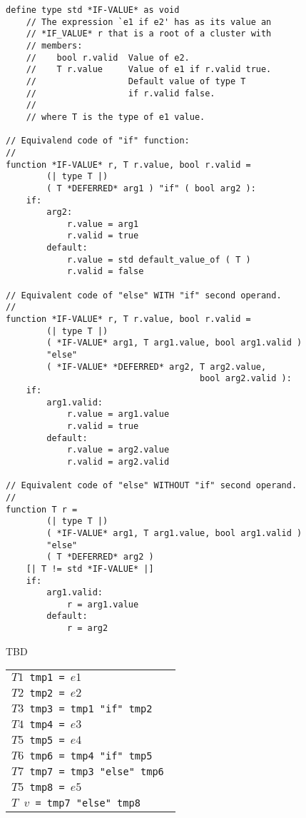 \documentclass[12pt]{article}
\newenvironment{indpar}[1][0.3in]%
	{\begin{list}{}%
		     {\setlength{\itemsep}{0in}%
		      \setlength{\topsep}{0in}%
		      \setlength{\parsep}{1ex}%
		      \setlength{\labelwidth}{#1}%
		      \setlength{\leftmargin}{#1}%
		      \addtolength{\leftmargin}{\labelsep}}%
	 \item}%
	{\end{list}}
\begin{document}
\begin{indpar}\begin{verbatim}
define type std *IF-VALUE* as void
    // The expression `e1 if e2' has as its value an
    // *IF_VALUE* r that is a root of a cluster with
    // members:
    //    bool r.valid  Value of e2.
    //    T r.value     Value of e1 if r.valid true.
    //                  Default value of type T
    //                  if r.valid false.
    //
    // where T is the type of e1 value.

// Equivalend code of "if" function:
//
function *IF-VALUE* r, T r.value, bool r.valid =
        (| type T |)
        ( T *DEFERRED* arg1 ) "if" ( bool arg2 ):
    if:
        arg2:
            r.value = arg1
            r.valid = true
        default:
            r.value = std default_value_of ( T )
            r.valid = false

// Equivalent code of "else" WITH "if" second operand.
//
function *IF-VALUE* r, T r.value, bool r.valid =
        (| type T |)
        ( *IF-VALUE* arg1, T arg1.value, bool arg1.valid )
        "else"
        ( *IF-VALUE* *DEFERRED* arg2, T arg2.value,
                                      bool arg2.valid ):
    if:
        arg1.valid:
            r.value = arg1.value
            r.valid = true
        default:
            r.value = arg2.value
            r.valid = arg2.valid

// Equivalent code of "else" WITHOUT "if" second operand.
//
function T r =
        (| type T |)
        ( *IF-VALUE* arg1, T arg1.value, bool arg1.valid )
        "else"
        ( T *DEFERRED* arg2 )
	[| T != std *IF-VALUE* |]
    if:
        arg1.valid:
            r = arg1.value
        default:
            r = arg2
\end{verbatim}\end{indpar}

TBD

\begin{center}
\begin{tabular}{l}
\tt $T1$ tmp1 = $e1$ \\
\tt $T2$ tmp2 = $e2$ \\
\tt $T3$ tmp3 = tmp1 "if" tmp2 \\
\tt $T4$ tmp4 = $e3$ \\
\tt $T5$ tmp5 = $e4$ \\
\tt $T6$ tmp6 = tmp4 "if" tmp5 \\
\tt $T7$ tmp7 = tmp3 "else" tmp6 \\
\tt $T5$ tmp8 = $e5$ \\
\tt $T$ $v$ = tmp7 "else" tmp8 \\
\end{tabular}
\end{center}
\end{document}
